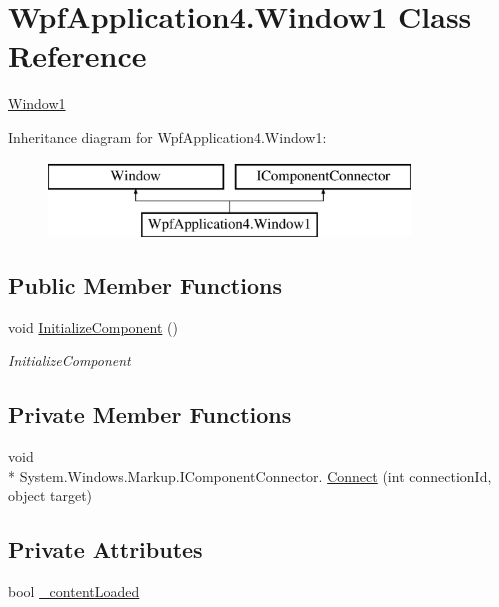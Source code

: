 \hypertarget{classWpfApplication4_1_1Window1}{\section{Wpf\-Application4.\-Window1 Class Reference}
\label{classWpfApplication4_1_1Window1}
}


\hyperlink{classWpfApplication4_1_1Window1}{Window1}  


Inheritance diagram for Wpf\-Application4.\-Window1\-:\begin{figure}[H]
\begin{center}
\leavevmode
\includegraphics[height=2.000000cm]{classWpfApplication4_1_1Window1}
\end{center}
\end{figure}
\subsection*{Public Member Functions}
\begin{DoxyCompactItemize}
\item 
void \hyperlink{classWpfApplication4_1_1Window1_a6995404d0d7e297f145b6d768e4b2a43}{Initialize\-Component} ()
\begin{DoxyCompactList}\small\item\em Initialize\-Component \end{DoxyCompactList}\end{DoxyCompactItemize}
\subsection*{Private Member Functions}
\begin{DoxyCompactItemize}
\item 
void \\*
System.\-Windows.\-Markup.\-I\-Component\-Connector. \hyperlink{classWpfApplication4_1_1Window1_abced669e1658dafc7f6d4e05eac7f6cc}{Connect} (int connection\-Id, object target)
\end{DoxyCompactItemize}
\subsection*{Private Attributes}
\begin{DoxyCompactItemize}
\item 
bool \hyperlink{classWpfApplication4_1_1Window1_aaba1ddab2801ca465abb0092ccc6c6bf}{\-\_\-content\-Loaded}
\end{DoxyCompactItemize}


